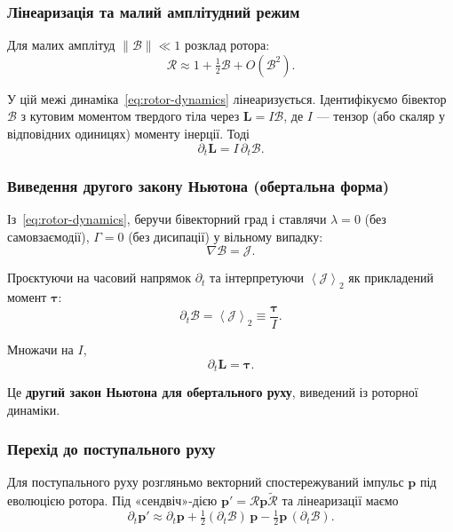 \documentclass[11pt,a4paper]{article}
\newcommand{\grade}[2]{\left\langle #1 \right\rangle_{#2}}
\newcommand{\biv}[1]{\grade{#1}{2}}
\newcommand{\rev}[1]{\widetilde{#1}}           %
\newcommand{\Rotor}{\mathcal{R}}
\newcommand{\Biv}{\mathcal{B}}
\newcommand{\D}{\nabla}                        %
\theoremstyle{definition}
\theoremstyle{plain}
\theoremstyle{remark}
\begin{document}
\subsubsection{Лінеаризація та малий амплітудний режим}

Для малих амплітуд $\|\Biv\| \ll 1$ розклад ротора:
\begin{equation}
\Rotor \approx 1 + \tfrac{1}{2}\Biv + O(\Biv^2).
\end{equation}

У цій межі динаміка~\eqref{eq:rotor-dynamics} лінеаризується. Ідентифікуємо бівектор $\Biv$ з кутовим моментом твердого тіла через $\bm{L} = I\Biv$, де $I$ — тензор (або скаляр у відповідних одиницях) моменту інерції. Тоді
\begin{equation}
\partial_t \bm{L} = I\, \partial_t \Biv.
\end{equation}

\subsubsection{Виведення другого закону Ньютона (обертальна форма)}

Із~\eqref{eq:rotor-dynamics}, беручи бівекторний град і ставлячи $\lambda=0$ (без самовзаємодії), $\Gamma=0$ (без дисипації) у вільному випадку:
\begin{equation}
\D \Biv = \mathcal{J}.
\end{equation}

Проєктуючи на часовий напрямок $\partial_t$ та інтерпретуючи $\biv{\mathcal{J}}$ як прикладений момент $\bm{\tau}$:
\begin{equation}
\partial_t \Biv = \biv{\mathcal{J}} \equiv \frac{\bm{\tau}}{I}.
\end{equation}

Множачи на $I$,
\begin{equation}
\partial_t \bm{L} = \bm{\tau}.
\label{eq:newton-rotational}
\end{equation}

Це \textbf{другий закон Ньютона для обертального руху}, виведений із роторної динаміки.

\subsubsection{Перехід до поступального руху}

Для поступального руху розгляньмо векторний спостережуваний імпульс $\mathbf{p}$ під еволюцією ротора. Під «сендвіч»-дією $\mathbf{p}' = \Rotor \mathbf{p} \rev{\Rotor}$ та лінеаризації маємо
\begin{equation}
\partial_t \mathbf{p}' \approx \partial_t \mathbf{p} + \tfrac{1}{2}(\partial_t\Biv)\, \mathbf{p} - \tfrac{1}{2}\mathbf{p}\,(\partial_t\Biv).
\end{equation}
\end{document}
